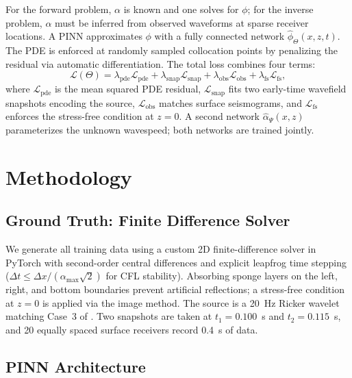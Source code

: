 \documentclass[11pt, letterpaper]{article}
\begin{document}
For the forward problem, $\alpha$ is known and one solves for $\phi$;
for the inverse problem, $\alpha$ must be inferred from observed waveforms at sparse receiver locations.
A PINN approximates $\phi$ with a fully connected network $\hat{\phi}_\Theta(x,z,t)$.
The PDE is enforced at randomly sampled collocation points by penalizing the residual via automatic differentiation.
The total loss combines four terms:
\begin{equation}
  \mathcal{L}(\Theta) = \lambda_{\text{pde}}\mathcal{L}_{\text{pde}}
  + \lambda_{\text{snap}}\mathcal{L}_{\text{snap}}
  + \lambda_{\text{obs}}\mathcal{L}_{\text{obs}}
  + \lambda_{\text{fs}}\mathcal{L}_{\text{fs}},
  \label{eq:total-loss}
\end{equation}
where $\mathcal{L}_{\text{pde}}$ is the mean squared PDE residual, $\mathcal{L}_{\text{snap}}$ fits two early-time wavefield snapshots encoding the source, $\mathcal{L}_{\text{obs}}$ matches surface seismograms, and $\mathcal{L}_{\text{fs}}$ enforces the stress-free condition at $z=0$.
A second network $\hat{\alpha}_\Psi(x,z)$ parameterizes the unknown wavespeed; both networks are trained jointly.

\section{Methodology}
\label{sec:method}

\subsection{Ground Truth: Finite Difference Solver}
\label{sec:fd-solver}

We generate all training data using a custom 2D finite-difference solver in PyTorch with second-order central differences and explicit leapfrog time stepping ($\Delta t \leq \Delta x / (\alpha_{\max}\sqrt{2})$ for CFL stability).
Absorbing sponge layers on the left, right, and bottom boundaries prevent artificial reflections;
a stress-free condition at $z = 0$ is applied via the image method.
The source is a 20~Hz Ricker wavelet matching Case~3 of \citet{rashtbehesht2022}.
Two snapshots are taken at $t_1 = 0.100$~s and $t_2 = 0.115$~s, and 20 equally spaced surface receivers record 0.4~s of data.

\subsection{PINN Architecture}
\label{sec:architecture}
\end{document}
